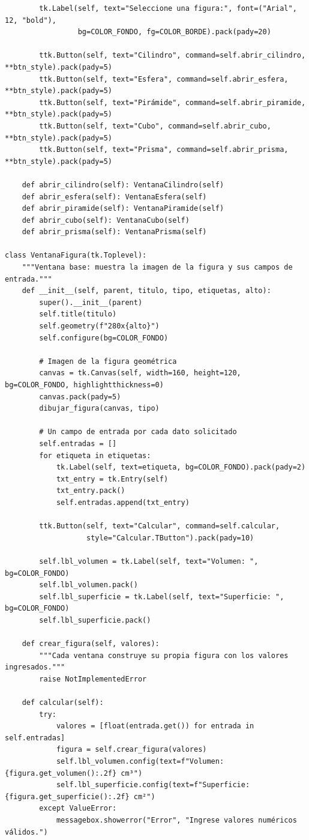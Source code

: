 \documentclass[11pt, a4paper]{article}
\begin{document}
\begin{lstlisting}
        tk.Label(self, text="Seleccione una figura:", font=("Arial", 12, "bold"),
                 bg=COLOR_FONDO, fg=COLOR_BORDE).pack(pady=20)

        ttk.Button(self, text="Cilindro", command=self.abrir_cilindro, **btn_style).pack(pady=5)
        ttk.Button(self, text="Esfera", command=self.abrir_esfera, **btn_style).pack(pady=5)
        ttk.Button(self, text="Pirámide", command=self.abrir_piramide, **btn_style).pack(pady=5)
        ttk.Button(self, text="Cubo", command=self.abrir_cubo, **btn_style).pack(pady=5)
        ttk.Button(self, text="Prisma", command=self.abrir_prisma, **btn_style).pack(pady=5)

    def abrir_cilindro(self): VentanaCilindro(self)
    def abrir_esfera(self): VentanaEsfera(self)
    def abrir_piramide(self): VentanaPiramide(self)
    def abrir_cubo(self): VentanaCubo(self)
    def abrir_prisma(self): VentanaPrisma(self)

class VentanaFigura(tk.Toplevel):
    """Ventana base: muestra la imagen de la figura y sus campos de entrada."""
    def __init__(self, parent, titulo, tipo, etiquetas, alto):
        super().__init__(parent)
        self.title(titulo)
        self.geometry(f"280x{alto}")
        self.configure(bg=COLOR_FONDO)

        # Imagen de la figura geométrica
        canvas = tk.Canvas(self, width=160, height=120, bg=COLOR_FONDO, highlightthickness=0)
        canvas.pack(pady=5)
        dibujar_figura(canvas, tipo)

        # Un campo de entrada por cada dato solicitado
        self.entradas = []
        for etiqueta in etiquetas:
            tk.Label(self, text=etiqueta, bg=COLOR_FONDO).pack(pady=2)
            txt_entry = tk.Entry(self)
            txt_entry.pack()
            self.entradas.append(txt_entry)

        ttk.Button(self, text="Calcular", command=self.calcular,
                   style="Calcular.TButton").pack(pady=10)

        self.lbl_volumen = tk.Label(self, text="Volumen: ", bg=COLOR_FONDO)
        self.lbl_volumen.pack()
        self.lbl_superficie = tk.Label(self, text="Superficie: ", bg=COLOR_FONDO)
        self.lbl_superficie.pack()

    def crear_figura(self, valores):
        """Cada ventana construye su propia figura con los valores ingresados."""
        raise NotImplementedError

    def calcular(self):
        try:
            valores = [float(entrada.get()) for entrada in self.entradas]
            figura = self.crear_figura(valores)
            self.lbl_volumen.config(text=f"Volumen: {figura.get_volumen():.2f} cm³")
            self.lbl_superficie.config(text=f"Superficie: {figura.get_superficie():.2f} cm²")
        except ValueError:
            messagebox.showerror("Error", "Ingrese valores numéricos válidos.")


\end{lstlisting}
\end{document}
